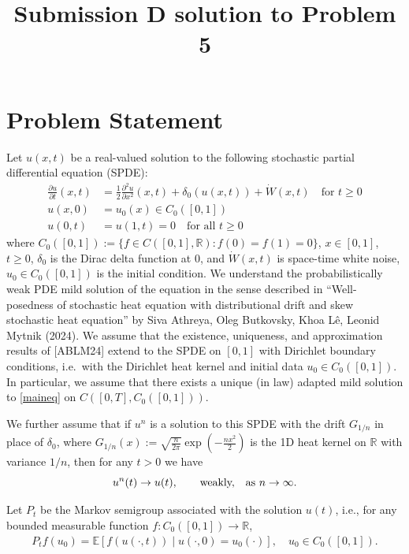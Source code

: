 \documentclass[12pt]{article}
\newcommand{\R}{\mathbb{R}}
\begin{document}
\title{Submission D solution to Problem 5}
\date{}
\maketitle


\section*{Problem Statement}

Let $u(x,t)$ be a real-valued solution to the following stochastic partial differential equation (SPDE):
\begin{align}\tag{$*$}\label{maineq}
    \frac{\partial u}{\partial t}(x,t) &= \frac{1}{2} \frac{\partial^2 u}{\partial x^2}(x,t) + \delta_0(u(x,t)) +  \dot{W}(x,t) \quad\text{for }t \geq 0\\
    u(x,0) &= u_0(x)\in C_0([0,1])\nonumber\\
    u(0,t) &= u(1,t)=0\quad\text{for all }t\geq0    \nonumber
\end{align}
where $C_0([0,1]):=\{f\in C([0,1],\R): f(0)=f(1)=0\}$, $x \in [0,1]$, $t \geq 0$, $\delta_0$ is the Dirac delta function at $0$, and $\dot{W}(x,t)$ is space-time white noise, $u_0\in C_0([0,1])$ is the initial condition. We understand the probabilistically weak PDE mild solution of the equation in the sense described in ``Well-posedness of stochastic heat equation with distributional drift and skew stochastic heat equation'' by Siva Athreya, Oleg Butkovsky, Khoa L\^{e}, Leonid Mytnik (2024). 
We assume that the existence, uniqueness, and approximation results of [ABLM24] extend to the SPDE on $[0,1]$ with Dirichlet boundary conditions, i.e.\ with the Dirichlet heat kernel and initial data $u_0\in C_0([0,1])$. In particular, we assume that there exists a unique (in law) adapted mild solution to \eqref{maineq} on $C([0,T],C_0([0,1]))$.

We further assume that if $u^n$ is a solution to this SPDE with the drift $G_{1/n}$ in place of $\delta_0$, where $G_{1/n}(x):=\sqrt{\frac{n}{2\pi}} \exp(-\frac{n x^2}{2})$ is the 1D heat kernel on $\mathbb{R}$ with variance $1/n$, then for any $t>0$ we have 
\begin{equation*}
u^n(t)\to u(t),\qquad\text{weakly, \,\, as $n\to\infty$}.
\end{equation*}

Let $P_t$ be the Markov semigroup associated with the solution $u(t)$, i.e., for any bounded measurable function $f\colon C_0([0,1])\to\R$,
\begin{align}
    P_t f(u_0) = \mathbb{E}[f(u(\cdot,t)) \mid u(\cdot,0) = u_0(\cdot)],\quad u_0\in C_0([0,1]).
\end{align}
\end{document}
